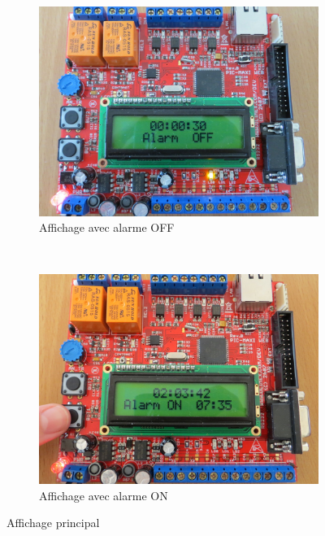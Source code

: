\documentclass[12pt,a4paper]{article}
\begin{document}
\begin{figure}[!h]
        \centering
        \begin{subfigure}[b]{0.5\textwidth}
                \includegraphics[width=\textwidth]{photos/IMG_2152.JPG}
                \caption{Affichage avec alarme OFF}
                \label{fig:alarmeoff}
        \end{subfigure}%
        ~ %
        \begin{subfigure}[b]{0.5\textwidth}
                \includegraphics[width=\textwidth]{photos/IMG_2158.JPG}
                \caption{Affichage avec alarme ON}
                \label{fig:alarmeon}
        \end{subfigure}
        \caption{Affichage principal}
        \label{fig:réveil}
\end{figure}
\end{document}
